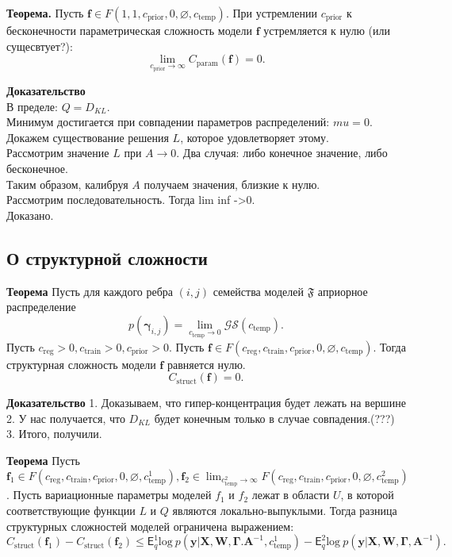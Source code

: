 \textbf{Теорема.}
Пусть $\mathbf{f} \in F(1, 1, c_{\text{prior}}, 0, \varnothing,  c_{\text{temp}} )$.
При устремлении $ c_{\text{prior}}$ к бесконечности параметрическая сложность модели $\mathbf{f}$ устремляется к нулю (или сущесвтует?):
\[
    \lim_{c_{\text{prior}} \to \infty} C_{\text{param}}(\mathbf{f}) = 0.
\]

\textbf{Доказательство}\\
В пределе: $Q = D_{KL}.$\\
Минимум достигается при совпадении параметров распределений: $mu = 0$.\\
Докажем существование решения $L$, которое удовлетворяет этому.\\
Рассмотрим значение $L$ при $A \to 0$. Два случая: либо конечное значение, либо бесконечное.\\
Таким образом, калибруя $A$ получаем значения, близкие к нулю. \\
Рассмотрим последовательность. Тогда lim inf ->0.\\
Доказано. 








\subsection{О структурной сложности}
\textbf{Теорема}
Пусть для каждого ребра $(i,j)$ семейства моделей $\mathfrak{F}$ априорное распределение $$p(\boldsymbol{\gamma}_{i,j}) =  \lim_{c_{\text{temp}} \to 0} \mathcal{GS}(c_{\text{temp}}).$$
Пусть $c_{\text{reg}} >0, c_{\text{train}} >0, c_{\text{prior}}>0$.
Пусть $\mathbf{f} \in F(c_{\text{reg}}, c_{\text{train}}, c_{\text{prior}}, 0, \varnothing, c_{\text{temp}})$.
Тогда структурная сложность модели $\mathbf{f}$ равняется нулю.
\[
    C_\text{struct}(\mathbf{f}) = 0.
\]
    
\textbf{Доказательство}
1. Доказываем, что гипер-концентрация будет лежать на вершине\\
2. У нас получается, что $D_{KL}$ будет конечным только в случае совпадения.(???)
3. Итого, получили.

\textbf{Теорема}
Пусть $\mathbf{f}_1 \in F(c_{\text{reg}}, c_{\text{train}},  c_{\text{prior}}, 0, \varnothing,  c^1_{\text{temp}}), \mathbf{f}_2   \in \lim_{c^2_{\text{temp}} \to \infty} F(c_{\text{reg}}, c_{\text{train}},  c_{\text{prior}}, 0, \varnothing,  c^2_{\text{temp}})$.
Пусть вариационные параметры моделей $f_1$ и $f_2$ лежат в области $U$, в которой соответствующие функции $L$ и $Q$ являются локально-выпуклыми. 
Тогда разница структурных сложностей моделей ограничена выражением:
\[
    C_\text{struct}(\mathbf{f}_1)  - C_\text{struct}(\mathbf{f}_2) \leq {\mathsf{E}_q^1 \text{log}~{p(\mathbf{y} | \mathbf{X}, \mathbf{W}, \boldsymbol{\Gamma}. \mathbf{A}^{-1}, c^1_{\text{temp}})}} - {\mathsf{E}_q^2 \text{log}~{p(\mathbf{y} | \mathbf{X}, \mathbf{W}, \boldsymbol{\Gamma}, \mathbf{A}^{-1})}}.
\]


